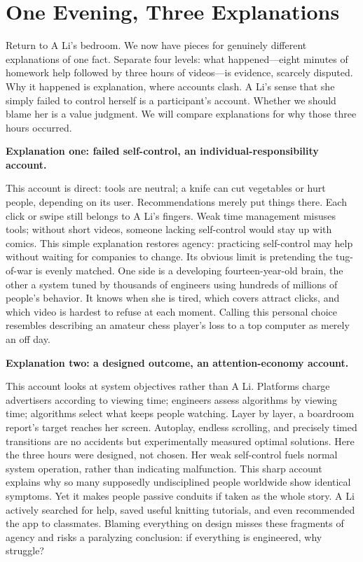 \section{One Evening, Three Explanations}
Return to A Li's bedroom. We now have pieces for genuinely different explanations of one fact. Separate four levels: what happened---eight minutes of homework help followed by three hours of videos---is evidence, scarcely disputed. Why it happened is explanation, where accounts clash. A Li's sense that she simply failed to control herself is a participant's account. Whether we should blame her is a value judgment. We will compare explanations for why those three hours occurred.

\textbf{Explanation one: failed self-control, an individual-responsi\-bility account.}

This account is direct: tools are neutral; a knife can cut vegetables or hurt people, depending on its user. Recommendations merely put things there. Each click or swipe still belongs to A Li's fingers. Weak time management misuses tools; without short videos, someone lacking self-control would stay up with comics. This simple explanation restores agency: practicing self-control may help without waiting for companies to change. Its obvious limit is pretending the tug-of-war is evenly matched. One side is a developing fourteen-year-old brain, the other a system tuned by thousands of engineers using hundreds of millions of people's behavior. It knows when she is tired, which covers attract clicks, and which video is hardest to refuse at each moment. Calling this personal choice resembles describing an amateur chess player's loss to a top computer as merely an off day.

\textbf{Explanation two: a designed outcome, an attention-economy account.}

This account looks at system objectives rather than A Li. Platforms charge advertisers according to viewing time; engineers assess algorithms by viewing time; algorithms select what keeps people watching. Layer by layer, a boardroom report's target reaches her screen. Autoplay, endless scrolling, and precisely timed transitions are no accidents but experimentally measured optimal solutions. Here the three hours were designed, not chosen. Her weak self-control fuels normal system operation, rather than indicating malfunction. This sharp account explains why so many supposedly undisciplined people worldwide show identical symptoms. Yet it makes people passive conduits if taken as the whole story. A Li actively searched for help, saved useful knitting tutorials, and even recommended the app to classmates. Blaming everything on design misses these fragments of agency and risks a paralyzing conclusion: if everything is engineered, why struggle?

